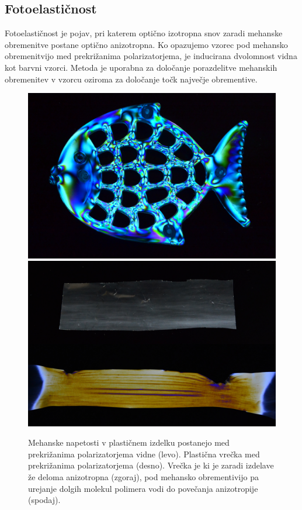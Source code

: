 \subsection*{Fotoelastičnost}
Fotoelastičnost je pojav, pri katerem optično izotropna snov zaradi mehanske obremenitve 
postane optično anizotropna. Ko opazujemo vzorec pod mehansko obremenitvijo med prekrižanima
polarizatorjema, je inducirana dvolomnost vidna kot barvni vzorci. Metoda je uporabna za 
določanje porazdelitve mehanskih obremenitev v vzorcu oziroma za določanje točk največje 
obrementive.
\begin{figure}[ht]
\centering
\includegraphics[width=7truecm]{slike/10_fotoelasticnost1.jpg}\hfill
\includegraphics[width=7truecm]{slike/10_fotoelasticnost2.jpg}
\caption{Mehanske napetosti v plastičnem izdelku postanejo med prekrižanima 
polarizatorjema vidne (levo). Plastična vrečka med prekrižanima polarizatorjema (desno).
Vrečka je ki je zaradi izdelave že deloma anizotropna (zgoraj), 
pod mehansko obrementivijo pa urejanje dolgih molekul polimera vodi 
do povečanja anizotropije (spodaj).}
\label{fig:10_fotoelasticnost}
\end{figure}

